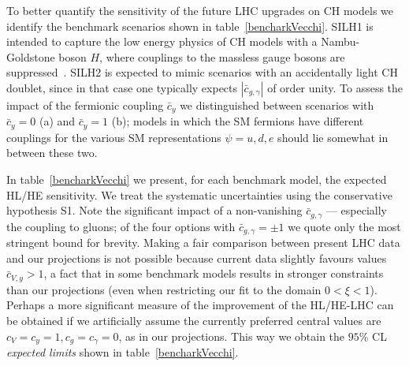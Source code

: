 To better quantify the sensitivity of the future LHC upgrades on CH models we identify the benchmark scenarios shown in table~\ref{bencharkVecchi}. SILH1 is intended to capture the low energy physics of CH models with a Nambu-Goldstone boson $H$, where couplings to the massless gauge bosons are suppressed~\cite{Giudice:2007fh}. SILH2 is expected to mimic scenarios with an accidentally light CH doublet, since in that case one typically expects $|\bar c_{g,\gamma}|$ of order unity. To assess the impact of the fermionic coupling $\bar c_y$ we distinguished between scenarios with $\bar c_y=0$ (a) and $\bar c_y=1$ (b); models in which the SM fermions have different couplings for the various SM representations $\psi=u,d,e$ should lie somewhat in between these two. 


In table~\ref{bencharkVecchi} we present, for each benchmark model, the expected HL/HE sensitivity. We treat the systematic uncertainties using the conservative hypothesis S1. Note the significant impact of a non-vanishing $\bar c_{g,\gamma}$ --- especially the coupling to gluons; of the four options with $\bar c_{g,\gamma}=\pm1$ we quote only the most stringent bound for brevity. Making a fair comparison between present LHC data and our projections is not possible because current data slightly favours values $\bar c_{V,y}>1$, a fact that in some benchmark models results in stronger constraints than our projections (even when restricting our fit to the domain $0<\xi<1$). Perhaps a more significant measure of the improvement of the HL/HE-LHC can be obtained if we artificially assume the currently preferred central values are $c_V=c_y=1, c_g=c_\gamma=0$, as in our projections. This way we obtain the $95\%$ CL {\emph{expected limits}} shown in table~\ref{bencharkVecchi}.





